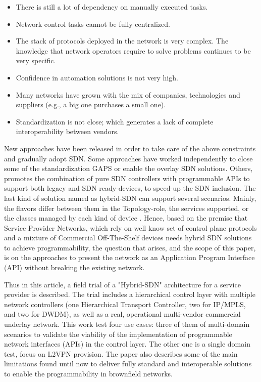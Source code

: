 \documentclass[a4paper,fleqn]{cas-dc}
\begin{document}
\begin{itemize}
    \item There is still a lot of dependency on manually executed tasks.
    \item Network control tasks cannot be fully centralized.
    \item The stack of protocols deployed in the network is very complex.  The knowledge that network operators require to solve problems continues to be very specific.
    \item Confidence in automation solutions is not very high.
    \item Many networks have grown with the mix of companies, technologies and suppliers (e.g., a big one purchases a small one). 
   \item Standardization is not close; which generates a lack of complete interoperability between vendors.
\end{itemize}

New approaches have been released in order to take care of the above constraints and gradually adopt SDN. Some approaches have worked independently to close some of the standardization GAPS or enable the overlay SDN solutions. Others, promotes the combination of pure SDN controllers with programmable APIs to support both legacy and SDN ready-devices, to speed-up the SDN inclusion. The last kind of solution named as hybrid-SDN can support several scenarios. Mainly, the flavors differ between them in the Topology-role, the services supported, or the classes managed by each kind of device \cite{vissicchio2014opportunities}. Hence, based on the premise that Service Provider Networks, which rely on well know set of control plane protocols and a mixture of Commercial Off-The-Shelf devices needs hybrid SDN solutions to achieve programmability, the question that arises, and the scope of this paper, is on the approaches to present the network as an Application Program Interface (API) without breaking the existing network. 

Thus in this article, a field trial of a "Hybrid-SDN" architecture for a service provider is described. The trial includes a hierarchical control layer with multiple network controllers (one Hierarchical Transport Controller, two for IP/MPLS, and two for DWDM), as well as a real, operational multi-vendor commercial underlay network. This work test four use cases: three of them of multi-domain scenarios to validate the viability of the implementation of programmable network interfaces (APIs) in the control layer. The other one is a single domain test, focus on L2VPN provision. The paper also describes some of the main limitations found until now to deliver fully standard and interoperable solutions to enable the programmability in brownfield networks. 
\end{document}
